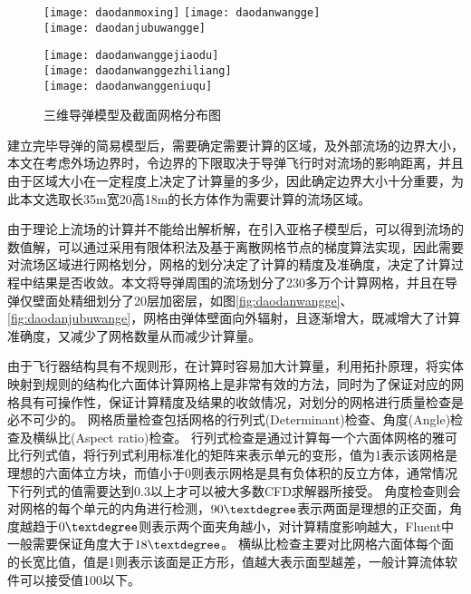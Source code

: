 \begin{figure}[bhpt]
\centering
{}
{\texttt{[image: daodanmoxing]}}
{\texttt{[image: daodanwangge]}}\\
{\texttt{[image: daodanjubuwangge]}}
{\begin{minipage}{0.45\linewidth}
\texttt{[image: daodanwanggejiaodu]}\\
\texttt{[image: daodanwanggezhiliang]}\\
\texttt{[image: daodanwanggeniuqu]}
\end{minipage}}
\caption{三维导弹模型及截面网格分布图}
\label{fig:daodan}
\end{figure}

建立完毕导弹的简易模型后，需要确定需要计算的区域，及外部流场的边界大小，本文在考虑外场边界时，令边界的下限取决于导弹飞行时对流场的影响距离，并且由于区域大小在一定程度上决定了计算量的多少，因此确定边界大小十分重要，为此本文选取长35m宽20高18m的长方体作为需要计算的流场区域。

由于理论上流场的计算并不能给出解析解，在引入亚格子模型后，可以得到流场的数值解，可以通过采用有限体积法及基于离散网格节点的梯度算法实现，因此需要对流场区域进行网格划分，网格的划分决定了计算的精度及准确度，决定了计算过程中结果是否收敛。本文将导弹周围的流场划分了230多万个计算网格，并且在导弹仅壁面处精细划分了20层加密层，如图\ref{fig:daodanwangge}、\ref{fig:daodanjubuwange}，网格由弹体壁面向外辐射，且逐渐增大，既减增大了计算准确度，又减少了网格数量从而减少计算量。

由于飞行器结构具有不规则形，在计算时容易加大计算量，利用拓扑原理，将实体映射到规则的结构化六面体计算网格上是非常有效的方法，同时为了保证对应的网格具有可操作性，保证计算精度及结果的收敛情况，对划分的网格进行质量检查是必不可少的。
网格质量检查包括网格的行列式(Determinant)检查、角度(Angle)检查及横纵比(Aspect ratio)检查。
行列式检查是通过计算每一个六面体网格的雅可比行列式值，将行列式利用标准化的矩阵来表示单元的变形，值为1表示该网格是理想的六面体立方块，而值小于0则表示网格是具有负体积的反立方体，通常情况下行列式的值需要达到0.3以上才可以被大多数CFD求解器所接受。
角度检查则会对网格的每个单元的内角进行检测，$90\textdegree$表示两面是理想的正交面，角度越趋于$0\textdegree$则表示两个面夹角越小，对计算精度影响越大，Fluent中一般需要保证角度大于$18\textdegree$。
横纵比检查主要对比网格六面体每个面的长宽比值，值是1则表示该面是正方形，值越大表示面型越差，一般计算流体软件可以接受值100以下。

